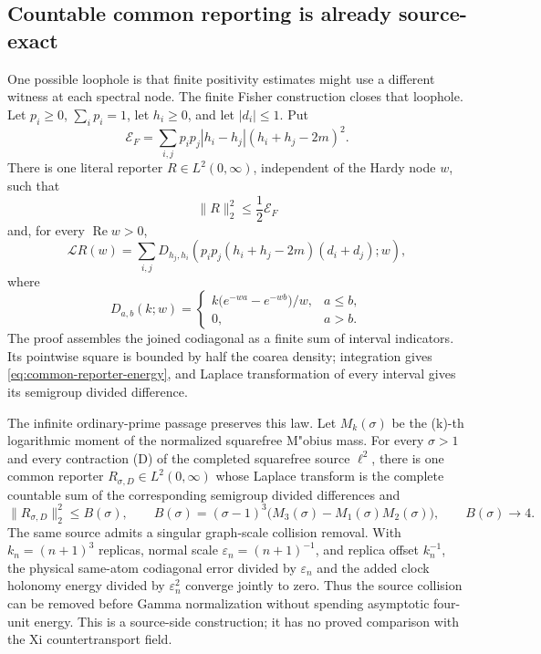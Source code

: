 \documentclass[11pt]{article}
\theoremstyle{definition}
\theoremstyle{remark}
\newcommand{\Rea}{\operatorname{Re}}
\begin{document}
\subsection{Countable common reporting is already source-exact}

One possible loophole is that finite positivity estimates might use a
different witness at each spectral node.  The finite Fisher construction
closes that loophole.  Let \(p_i\ge0\), \(\sum_i p_i=1\), let
\(h_i\ge0\), and let \(|d_i|\le1\).  Put
\[
 \mathcal E_F=
 \sum_{i,j}p_ip_j|h_i-h_j|
       (h_i+h_j-2m)^2.
\tag{3.13}\label{eq:fisher-holonomy-energy}
\]
There is one literal reporter \(R\in L^2(0,\infty)\), independent of the
Hardy node \(w\), such that
\[
                         \|R\|_2^2\le\frac12\mathcal E_F
\tag{3.14}\label{eq:common-reporter-energy}
\]
and, for every \(\Rea w>0\),
\[
 \mathcal L R(w)=
 \sum_{i,j}
 D_{h_j,h_i}\!\left(
 p_ip_j(h_i+h_j-2m)(d_i+d_j);w\right),
\tag{3.15}\label{eq:common-reporter-column}
\]
where
\[
 D_{a,b}(k;w)=
 \begin{cases}
 k\bigl(e^{-wa}-e^{-wb}\bigr)/w,&a\le b,\\
 0,&a>b.
 \end{cases}
\]
The proof assembles the joined codiagonal as a finite sum of interval
indicators.  Its pointwise square is bounded by half the coarea density;
integration gives \eqref{eq:common-reporter-energy}, and Laplace
transformation of every interval gives its semigroup divided difference.

The infinite ordinary-prime passage preserves this law.  Let
\(M_k(\sigma)\) be the (k)-th logarithmic moment of the normalized
squarefree M"obius mass.  For every \(\sigma>1\) and every contraction (D)
of the completed squarefree source \(\ell^2\), there is one common reporter
\(R_{\sigma,D}\in L^2(0,\infty)\) whose Laplace transform is the complete
countable sum of the corresponding semigroup divided differences and
\[
 \|R_{\sigma,D}\|_2^2\le B(\sigma),\qquad
 B(\sigma)=(\sigma-1)^3
     \bigl(M_3(\sigma)-M_1(\sigma)M_2(\sigma)\bigr),
 \qquad B(\sigma)\longrightarrow4.
\tag{3.16}\label{eq:countable-common-reporter}
\]
The same source admits a singular graph-scale collision removal.  With
\(k_n=(n+1)^3\) replicas, normal scale
\(\varepsilon_n=(n+1)^{-1}\), and replica offset \(k_n^{-1}\), the physical
same-atom codiagonal error divided by \(\varepsilon_n\) and the added clock
holonomy energy divided by \(\varepsilon_n^2\) converge jointly to zero.
Thus the source collision can be removed before Gamma normalization without
spending asymptotic four-unit energy.  This is a source-side construction;
it has no proved comparison with the Xi countertransport field.
\end{document}
